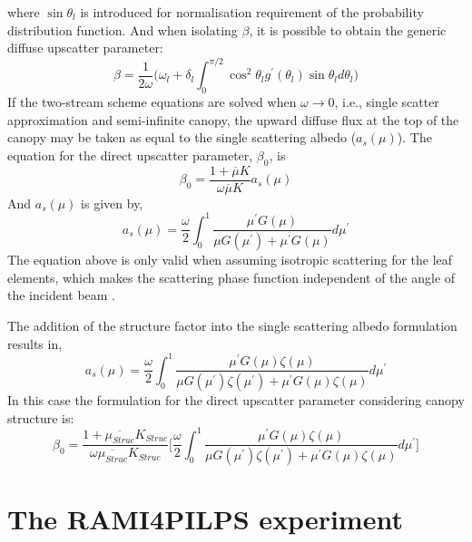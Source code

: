 \noindent where $\sin\theta_l$ is introduced for normalisation requirement of the probability distribution function. And when isolating $\beta$, it is possible to obtain the generic diffuse upscatter parameter:
\begin{equation}
\beta = \frac{1}{2\omega}\Big(\omega_l + \delta_l \int_{0}^{\pi/2} \cos^2 \theta_l g^\prime(\theta_l) \sin \theta_l d\theta_l\Big)
\label{equation:beta}
\end{equation}
If the two-stream scheme equations are solved when $\omega \rightarrow 0$, i.e., single scatter approximation and semi-infinite canopy, the upward diffuse flux at the top of the canopy may be taken as equal to the single scattering albedo ($a_s(\mu)$). The equation for the direct upscatter parameter, $\beta_0$, is
\begin{equation}
\beta_0 = \frac{1 + \overline{\mu}K}{\omega\overline{\mu}K}a_s(\mu)
\label{equation:betazero}
\end{equation}
And $a_s(\mu)$ is given by, 
\begin{equation}
a_s(\mu) = \frac{\omega}{2}\int_{0}^{1} \frac{\mu^\prime G(\mu)}{\mu G(\mu^\prime) + \mu^\prime G(\mu)} d\mu^\prime
\label{equation:alphas}
\end{equation}
The equation above is only valid when assuming isotropic scattering for the leaf elements, which makes the scattering phase function independent of the angle of the incident beam \citep{Dickinson1983,Sellers1985}.

The addition of the structure factor into the single scattering albedo formulation results in,
\begin{equation}
a_s(\mu) = \frac{\omega}{2}\int_{0}^{1} \frac{\mu^\prime G(\mu) \zeta(\mu)}{\mu G(\mu^\prime) \zeta(\mu^\prime) + \mu^\prime G(\mu)\zeta(\mu)} d\mu^\prime
\label{equation:alphasstruct}
\end{equation}
In this case the formulation for the direct upscatter parameter considering canopy structure is:
\begin{equation}
\beta_0 = \frac{1 + \overline{\mu_{Struc}}K_{Struc}}{\omega\overline{\mu_{Struc}}K_{Struc}}
\bigg[\frac{\omega}{2}\int_{0}^{1} \frac{\mu^\prime G(\mu) \zeta(\mu)}{\mu G(\mu^\prime) \zeta(\mu^\prime) + \mu^\prime G(\mu)\zeta(\mu)} d\mu^\prime \bigg]
\label{equation:alphasstruct}
\end{equation}

\section{The RAMI4PILPS experiment}

